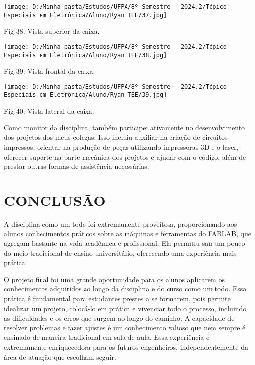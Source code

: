 \documentclass[
]{book}
\begin{document}
\texttt{[image: D:/Minha pasta/Estudos/UFPA/8º Semestre - 2024.2/Tópico Especiais em Eletrônica/Aluno/Ryan TEE/37.jpg]}

Fig 38: Vista superior da caixa.

\texttt{[image: D:/Minha pasta/Estudos/UFPA/8º Semestre - 2024.2/Tópico Especiais em Eletrônica/Aluno/Ryan TEE/38.jpg]}

Fig 39: Vista frontal da caixa.

\texttt{[image: D:/Minha pasta/Estudos/UFPA/8º Semestre - 2024.2/Tópico Especiais em Eletrônica/Aluno/Ryan TEE/39.jpg]}

Fig 40: Vista lateral da caixa.

Como monitor da disciplina, também participei ativamente no desenvolvimento dos projetos dos meus colegas. Isso incluiu auxiliar na criação de circuitos impressos, orientar na produção de peças utilizando impressoras 3D e o laser, oferecer suporte na parte mecânica dos projetos e ajudar com o código, além de prestar outras formas de assistência necessárias.

\chapter{CONCLUSÃO}\label{conclusuxe3o}

A disciplina como um todo foi extremamente proveitosa, proporcionando aos alunos conhecimentos práticos sobre as máquinas e ferramentas do FABLAB, que agregam bastante na vida acadêmica e profissional. Ela permitiu sair um pouco do meio tradicional de ensino universitário, oferecendo uma experiência mais prática.

O projeto final foi uma grande oportunidade para os alunos aplicarem os conhecimentos adquiridos ao longo da disciplina e do curso como um todo. Essa prática é fundamental para estudantes prestes a se formarem, pois permite idealizar um projeto, colocá-lo em prática e vivenciar todo o processo, incluindo as dificuldades e os erros que surgem ao longo do caminho. A capacidade de resolver problemas e fazer ajustes é um conhecimento valioso que nem sempre é ensinado de maneira tradicional em sala de aula. Essa experiência é extremamente enriquecedora para os futuros engenheiros, independentemente da área de atuação que escolham seguir.

  
\end{document}
